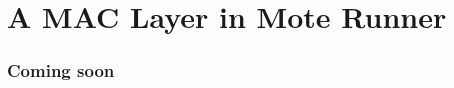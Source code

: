 \section{A MAC Layer in Mote Runner}
\begin{frame}[fragile]
  \frametitle{Coming soon}
  
\end{frame}